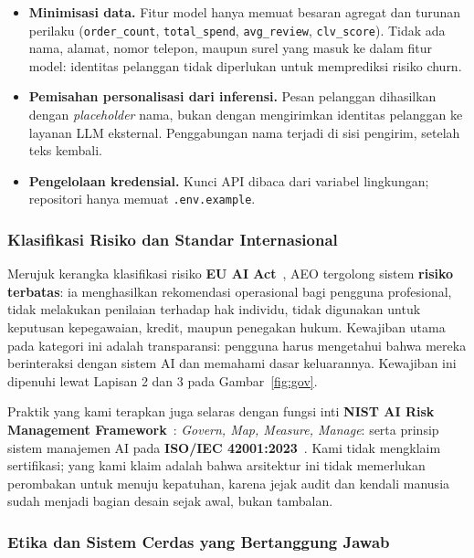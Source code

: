 \documentclass[12pt,a4paper]{article}
\begin{document}
\begin{itemize}
  \item \textbf{Minimisasi data.} Fitur model hanya memuat besaran agregat dan turunan perilaku (\texttt{order\_count}, \texttt{total\_spend}, \texttt{avg\_review}, \texttt{clv\_score}). Tidak ada nama, alamat, nomor telepon, maupun surel yang masuk ke dalam fitur model: identitas pelanggan tidak diperlukan untuk memprediksi risiko churn.
  \item \textbf{Pemisahan personalisasi dari inferensi.} Pesan pelanggan dihasilkan dengan \textit{placeholder} nama, bukan dengan mengirimkan identitas pelanggan ke layanan LLM eksternal. Penggabungan nama terjadi di sisi pengirim, setelah teks kembali.
  \item \textbf{Pengelolaan kredensial.} Kunci API dibaca dari variabel lingkungan; repositori hanya memuat \texttt{.env.example}.
\end{itemize}

\subsubsection{Klasifikasi Risiko dan Standar Internasional}

Merujuk kerangka klasifikasi risiko \textbf{EU AI Act}~\cite{euaiact}, AEO tergolong sistem \textbf{risiko terbatas}: ia menghasilkan rekomendasi operasional bagi pengguna profesional, tidak melakukan penilaian terhadap hak individu, tidak digunakan untuk keputusan kepegawaian, kredit, maupun penegakan hukum. Kewajiban utama pada kategori ini adalah transparansi: pengguna harus mengetahui bahwa mereka berinteraksi dengan sistem AI dan memahami dasar keluarannya. Kewajiban ini dipenuhi lewat Lapisan 2 dan 3 pada Gambar~\ref{fig:gov}.

Praktik yang kami terapkan juga selaras dengan fungsi inti \textbf{NIST AI Risk Management Framework}~\cite{nist}: \textit{Govern, Map, Measure, Manage}: serta prinsip sistem manajemen AI pada \textbf{ISO/IEC 42001:2023}~\cite{iso42001}. Kami tidak mengklaim sertifikasi; yang kami klaim adalah bahwa arsitektur ini tidak memerlukan perombakan untuk menuju kepatuhan, karena jejak audit dan kendali manusia sudah menjadi bagian desain sejak awal, bukan tambalan.

\subsubsection{Etika dan Sistem Cerdas yang Bertanggung Jawab}
\end{document}
